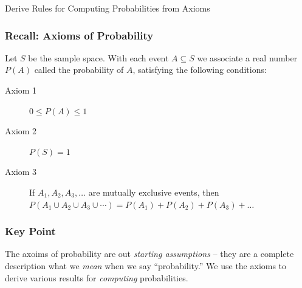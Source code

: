\documentclass[handout]{beamer}
\begin{document}
\begin{frame}

\begin{center}\Huge Derive Rules for Computing Probabilities from Axioms\end{center}
\end{frame}
\begin{frame}
\frametitle{Recall: Axioms of Probability}

Let $S$ be the sample space. With each event $A \subseteq S$ we associate a real number $P(A)$ called the \alert{probability of $A$}, satisfying the following conditions:
\vspace{1em}
\begin{description}
	\item[Axiom 1] $0 \leq P(A) \leq 1$ 
	\item[Axiom 2] $P(S)=1$
	\item[Axiom 3] If $A_1, A_2, A_3, \hdots$ are mutually exclusive events, then $P(A_1\cup A_2 \cup A_3 \cup \cdots) = P(A_1) + P(A_2) + P(A_3) + \hdots$
\end{description}

\end{frame}
\begin{frame}
\frametitle{Key Point}
The axoims of probability are out \emph{\alert{starting assumptions}} -- they are a complete description what we \emph{\alert{mean}} when we say ``probability.'' We use the axioms to derive various results for \emph{\alert{computing}} probabilities.
\end{frame}
\end{document}
